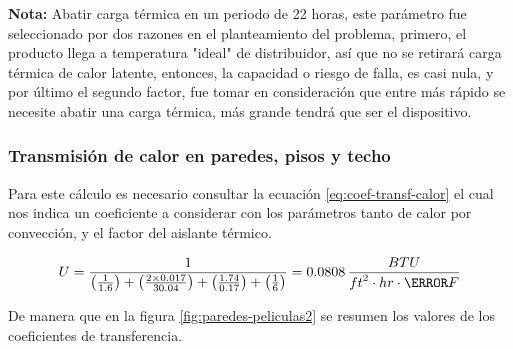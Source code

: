 \textbf{Nota:}  Abatir carga térmica en un periodo de 22 horas, este parámetro fue seleccionado por
dos razones en el planteamiento del problema, primero, el producto llega a temperatura "ideal" de distribuidor, así que no
se retirará carga térmica de calor latente, entonces, la capacidad o riesgo de falla, es casi
nula, y por último el segundo factor, fue tomar en consideración que entre más rápido se
necesite abatir una carga térmica, más grande tendrá que ser el dispositivo.

\subsubsection{Transmisión de calor en paredes, pisos y techo}

Para este cálculo es necesario consultar la ecuación \ref{eq:coef-transf-calor} el cual nos indica un coeficiente
a considerar con los parámetros tanto de calor por convección, y el factor del aislante térmico.

\begin{equation}
	U = 
	\frac{1}{\left( \frac{1}{1.6} \right) + \left( \frac{2\times 0.017 }{30.04} \right)+\left( \frac{1.74}{0.17}\right) + \left( \frac{1}{6}\right)} 
	= 0.0808 \, \frac{ {BTU}}{ {ft}^2 \cdot  {hr} \cdot \degree F}
	\label{eq:u}
\end{equation}

De manera que en la figura \ref{fig:paredes-peliculas2} se resumen los valores de los coeficientes de transferencia. 

